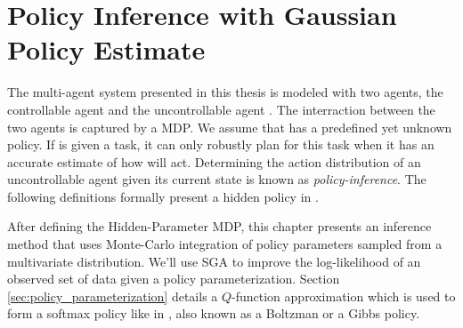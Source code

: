 %
%
\chapter{Policy Inference with Gaussian Policy Estimate}\label{chapt:gauss_policy}

    The multi-agent system presented in this thesis is modeled with two agents, the controllable agent  and the
    uncontrollable agent . The interraction between the two agents is captured by a \acf{MDP}. We assume that
     has a predefined yet unknown policy. If  is given a task, it can only robustly plan for this task
    when it has an accurate estimate of how  will act. Determining the action distribution of an uncontrollable
    agent given its current state is known as \textit{policy-inference}. The following definitions formally present a
    hidden policy in .

    After defining the Hidden-Parameter MDP, this chapter presents an inference method that uses Monte-Carlo integration
    of policy parameters sampled from a multivariate distribution. We'll use \ac{SGA} to improve the log-likelihood of
    an observed set of data given a policy parameterization. Section \ref{sec:policy_parameterization} details a
    $Q$-function approximation which is used to form a softmax policy like in \cite{nachum2017bridging}, also known as a
    Boltzman \cite{Hanawal2017LearningPolicies} or a Gibbs \cite{Sugiyama2015StatisticalRL} policy.

